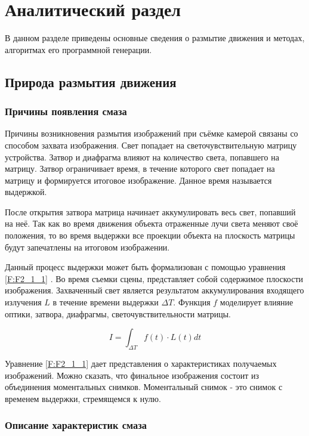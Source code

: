 \chapter{Аналитический раздел}
\label{cha:analysis}
В данном разделе приведены основные сведения о размытие движения и методах, алгоритмах его программной генерации. 

\section{Природа размытия движения}

\subsection{Причины появления смаза}

Причины возникновения размытия изображений при съёмке камерой связаны со способом захвата изображения. Свет попадает на светочувствительную матрицу устройства. Затвор и диафрагма влияют на количество света, попавшего на матрицу. Затвор ограничивает время, в течение которого свет попадает на матрицу и формируется итоговое изображение. Данное время называется выдержкой.
\par
После открытия затвора матрица начинает аккумулировать весь свет, попавший на неё. Так как во время движения объекта отраженные лучи света меняют своё положения, то во время выдержки все проекции объекта на плоскость матрицы будут запечатлены на итоговом изображении.    
\par
Данный процесс выдержки может быть формализован с помощью уравнения \eqref{F:F2_1_1} . Во время съемки сцены,  представляет собой содержимое плоскости изображения. Захваченный свет является результатом аккумулирования входящего излучения $L$ в течение времени выдержки $\Delta T$. Функция $f$ моделирует влияние оптики, затвора, диафрагмы, светочувствительности матрицы.
\par
\begin{equation}
    I = \int_{\Delta T} f(t) \cdot L(t) dt
    \label{F:F2_1_1}
\end{equation}
\par
Уравнение \eqref{F:F2_1_1} дает представления о характеристиках получаемых изображений. \cite{Navarro11} Можно сказать, что финальное изображения состоит из объединения моментальных снимков. Моментальный снимок - это снимок с временем выдержки, стремящемся к нулю.

\subsection{Описание характеристик смаза}


